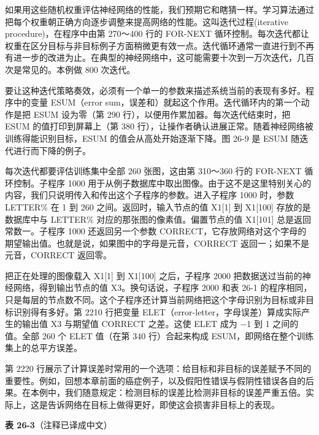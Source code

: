 如果用这些随机权重评估神经网络的性能，我们预期它和瞎猜一样。学习算法通过把每个权重朝正确方向逐步调整来提高网络的性能。这叫迭代过程(iterative
procedure)，在程序中由第 270～400 行的 FOR-NEXT
循环控制。每次迭代都让权重在区分目标与非目标例子方面稍微更有效一点。迭代循环通常一直进行到不再有进一步的改进为止。在典型的神经网络中，这可能需要十次到一万次迭代，几百次是常见的。本例做
800 次迭代。

要让这种迭代策略奏效，必须有一个单一的参数来描述系统当前的表现有多好。程序中的变量
ESUM（error sum，误差和）就起这个作用。迭代循环内的第一个动作是把 ESUM
设为零（第 290 行），以便用作累加器。每次迭代结束时，把 ESUM
的值打印到屏幕上（第 380
行），让操作者确认进展正常。随着神经网络被训练得能识别目标，ESUM
的值会从高处开始逐渐下降。图 26-9 是 ESUM 随迭代进行而下降的例子。

每次迭代都要评估训练集中全部 260 张图，这由第 310～360 行的 FOR-NEXT
循环控制。子程序 1000
用于从例子数据库中取出图像。由于这不是这里特别关心的内容，我们只说明传入和传出这个子程序的参数。进入子程序
1000 时，参数 LETTER\% 在 1 到 260 之间。返回时，输入节点的值 X1{[}1{]}
到 X1{[}100{]} 存放的是数据库中与 LETTER\%
对应的那张图的像素值。偏置节点的值 X1{[}101{]} 总是返回常数一。子程序
1000 还返回另一个参数
CORRECT，它存放网络对这个字母的期望输出值。也就是说，如果图中的字母是元音，CORRECT
返回一；如果不是元音，CORRECT 返回零。

把正在处理的图像载入 X1{[}1{]} 到 X1{[}100{]} 之后，子程序 2000
把数据送过当前的神经网络，得到输出节点的值 X3。换句话说，子程序 2000
和表 26-1
的程序相同，只是每层的节点数不同。这个子程序还计算当前网络把这个字母识别为目标或非目标识别得有多好。第
2210 行把变量 ELET（error-letter，字母误差）算成实际产生的输出值 X3
与期望值 CORRECT 之差。这使 ELET 成为 −1 到 1 之间的值。全部 260 个 ELET
值（在第 340 行）合起来构成 ESUM，即网络在整个训练集上的总平方误差。

第 2220
行展示了计算误差时常用的一个选项：给目标和非目标的误差赋予不同的重要性。例如，回想本章前面的癌症例子，以及假阳性错误与假阴性错误各自的后果。在本例中，我们随意规定：检测目标的误差比检测非目标的误差严重五倍。实际上，这是告诉网络在目标上做得更好，即使这会损害非目标上的表现。

\textbf{表 26-3}（注释已译成中文）

